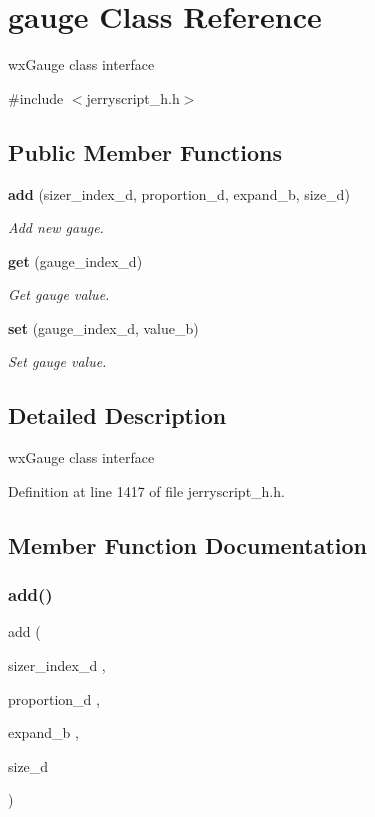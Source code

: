 \section{gauge Class Reference}
\label{classgauge}


wx\+Gauge class interface  




{\ttfamily \#include $<$jerryscript\+\_\+h.\+h$>$}

\subsection*{Public Member Functions}
\begin{DoxyCompactItemize}
\item 
\textbf{ add} (sizer\+\_\+index\+\_\+d, proportion\+\_\+d, expand\+\_\+b, size\+\_\+d)
\begin{DoxyCompactList}\small\item\em Add new gauge. \end{DoxyCompactList}\item 
\textbf{ get} (gauge\+\_\+index\+\_\+d)
\begin{DoxyCompactList}\small\item\em Get gauge value. \end{DoxyCompactList}\item 
\textbf{ set} (gauge\+\_\+index\+\_\+d, value\+\_\+b)
\begin{DoxyCompactList}\small\item\em Set gauge value. \end{DoxyCompactList}\end{DoxyCompactItemize}


\subsection{Detailed Description}
wx\+Gauge class interface 

Definition at line 1417 of file jerryscript\+\_\+h.\+h.



\subsection{Member Function Documentation}
\mbox{\label{classgauge_a5da6e659c69938ba73c64802e7ef99c1}} 
\subsubsection{add()}
{\footnotesize\ttfamily add (\begin{DoxyParamCaption}\item[{sizer\+\_\+index\+\_\+d}]{,  }\item[{proportion\+\_\+d}]{,  }\item[{expand\+\_\+b}]{,  }\item[{size\+\_\+d}]{ }\end{DoxyParamCaption})}



